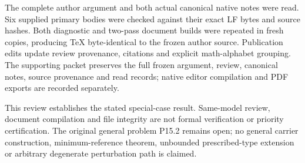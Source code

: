 \documentclass[
  11pt,
]{article}
\begin{document}
The complete author argument and both actual canonical native notes were
read. Six supplied primary bodies were checked against their exact LF
bytes and source hashes. Both diagnostic and two-pass document builds
were repeated in fresh copies, producing TeX byte-identical to the frozen
author source. Publication edits update review provenance, citations and
explicit math-alphabet grouping. The supporting packet preserves the
full frozen argument, review, canonical notes, source provenance and read
records; native editor compilation and PDF exports are recorded separately.

This review establishes the stated special-case result. Same-model review,
document compilation and file integrity are not formal verification or
priority certification. The original general problem P15.2 remains open;
no general carrier construction, minimum-reference theorem, unbounded
prescribed-type extension or arbitrary degenerate perturbation path is
claimed.
\end{document}
